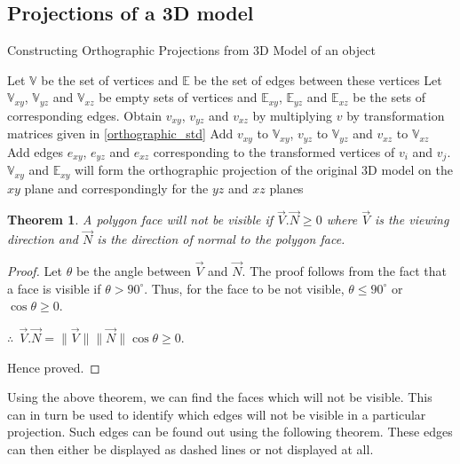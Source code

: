 \documentclass[12pt]{article}
\newtheorem{theorem}{Theorem}
\begin{document}
\subsection{Projections of a 3D model}

\begin{algorithm}
    \caption{Constructing Orthographic Projections from 3D Model of an object}
    \begin{algorithmic}
        \STATE Let $\mathbb{V}$ be the set of vertices and $\mathbb{E}$ be the set of edges between these vertices
        \STATE Let $ \mathbb{V}_{xy} $, $ \mathbb{V}_{yz} $ and $ \mathbb{V}_{xz} $ be empty sets of vertices and $ \mathbb{E}_{xy}$, $ \mathbb{E}_{yz}$ and $ \mathbb{E}_{xz}$ be the sets of corresponding edges.
            \STATE Obtain $v_{xy}$, $v_{yz}$ and $v_{xz}$ by multiplying $v$ by transformation matrices given in \eqref{orthographic_std} 
            \STATE Add $v_{xy}$ to  $ \mathbb{V}_{xy} $, $v_{yz}$ to  $ \mathbb{V}_{yz} $ and $v_{xz}$ to  $ \mathbb{V}_{xz} $ 
        \ENDFOR
            \STATE Add edges $e_{xy}$, $e_{yz}$ and $e_{xz}$ corresponding to the transformed vertices of $v_i$ and $v_j$.
        \ENDFOR
        \STATE $\mathbb{V}_{xy}$ and $\mathbb{E}_{xy}$ will form the orthographic projection of the original 3D model on the $xy$ plane and correspondingly for the $yz$ and $xz$ planes
    \end{algorithmic}
\end{algorithm}

\begin{theorem}
    A polygon face will not be visible if $\vec{V}.\vec{N} \geq 0 $ where $\vec{V}$ is the viewing direction and $\vec{N}$ is the direction of normal to the polygon face.
\end{theorem}
\begin{proof}
\item Let $\theta$ be the angle between $\vec{V}$ and $\vec{N}$. The proof follows from the fact that a face is visible if $\theta > 90 ^ {\circ}$. Thus, for the face to be not visible, $\theta \leq 90^ {\circ}$ or $\cos \theta \geq 0$.
\item $\therefore \ \ \vec{V}.\vec{N} = \| \vec{V} \|\| \vec{N} \| \cos \theta \geq 0$.
\item Hence proved.
\end{proof}

Using the above theorem, we can find the faces which will not be visible. This can in turn be used to identify which edges will not be visible in a particular projection. Such edges can be found out using the following theorem. These edges can then either be displayed as dashed lines or not displayed at all.
\end{document}
